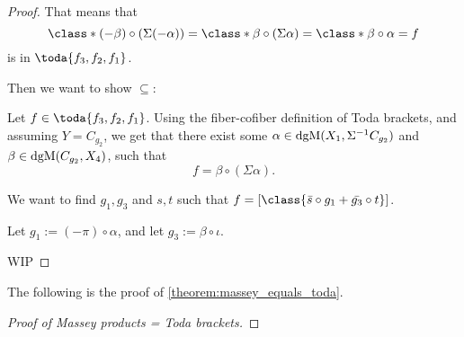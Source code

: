 \begin{proof}
    That means that
    \[
        \class*{(-\beta) \circ (\Sigma (- \alpha))} = \class*{\beta \circ (\Sigma \alpha)} = \class*{\beta \circ \alpha} = f
    \]
    is in \( \toda{f_3, f_2, f_1} \).

    Then we want to show \( \subseteq \):

    Let \( f \in \toda{f_3, f_2, f_1} \). Using the fiber-cofiber definition of Toda brackets, and assuming \( Y = C_{g_2} \), we get that there exist some \( \alpha \in \operatorname{dgM}(X_1, \Sigma^{-1} C_{g_2}) \) and \( \beta \in \operatorname{dgM}(C_{g_2}, X_4) \), such that
    \[
        f = \beta \circ (\Sigma \alpha).
    \]

    We want to find \( g_1, g_3 \) and \( s, t \) such that \( f = [\class{\bar{s} \circ g_1 + \bar{g_3} \circ t}] \).

    Let \( g_1 := (-\pi) \circ \alpha \), and let \( g_3 := \beta \circ \iota \).

    WIP
\end{proof}

The following is the proof of \autoref{theorem:massey_equals_toda}.

\begin{proof}[Proof of Massey products = Toda brackets]
    
\end{proof}